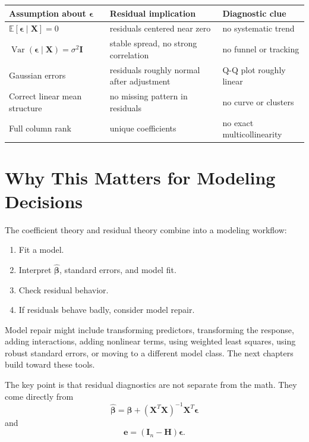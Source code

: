 \begin{center}
\begin{tabular}{p{}p{}p{}}
\toprule
Assumption about \(\boldsymbol{\epsilon}\) & Residual implication & Diagnostic clue \\
\midrule
\(\mathbb{E}[\boldsymbol{\epsilon}\mid\mathbf{X}]=0\) & residuals centered near zero & no systematic trend \\
\(\operatorname{Var}(\boldsymbol{\epsilon}\mid\mathbf{X})=\sigma^2\mathbf{I}\) & stable spread, no strong correlation & no funnel or tracking \\
Gaussian errors & residuals roughly normal after adjustment & Q-Q plot roughly linear \\
Correct linear mean structure & no missing pattern in residuals & no curve or clusters \\
Full column rank & unique coefficients & no exact multicollinearity \\
\bottomrule
\end{tabular}
\end{center}

\section{Why This Matters for Modeling Decisions}

The coefficient theory and residual theory combine into a modeling workflow:
\begin{enumerate}
  \item Fit a model.
  \item Interpret \(\widehat{\boldsymbol{\beta}}\), standard errors, and model fit.
  \item Check residual behavior.
  \item If residuals behave badly, consider model repair.
\end{enumerate}

Model repair might include transforming predictors, transforming the response, adding interactions, adding nonlinear terms, using weighted least squares, using robust standard errors, or moving to a different model class.  The next chapters build toward these tools.

The key point is that residual diagnostics are not separate from the math.  They come directly from
\begin{equation}
  \widehat{\boldsymbol{\beta}}
  =\boldsymbol{\beta}+(\mathbf{X}^T\mathbf{X})^{-1}\mathbf{X}^T\boldsymbol{\epsilon}
\end{equation}
and
\begin{equation}
  \mathbf{e}=(\mathbf{I}_n-\mathbf{H})\boldsymbol{\epsilon}.
\end{equation}


